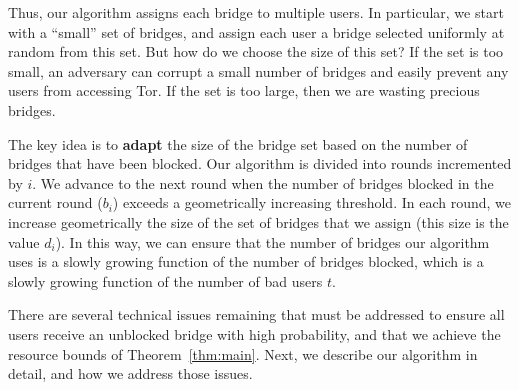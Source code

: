 \documentclass[letterpaper,twocolumn,10pt]{article}
\begin{document}
Thus, our algorithm assigns each bridge to multiple users.  In particular, we start with a ``small'' set of bridges, and assign each user a bridge selected uniformly at random from this set.  But how do we choose the size of this set?  If the set is too small, an adversary can corrupt a small number of bridges and easily prevent any users from accessing Tor.  If the set is too large, then we are wasting precious bridges.

The key idea is to \textbf{adapt} the size of the bridge set based on the number of bridges that have been blocked.  Our algorithm is divided into rounds incremented by $i$.  We advance to the next round when the number of bridges blocked in the current round ($b_i$) exceeds a geometrically increasing threshold.  In each round, we increase geometrically the size of the set of bridges that we assign (this size is the value $d_i$).  In this way, we can ensure that the number of bridges our algorithm uses is a slowly growing function of the number of bridges blocked, which is a slowly growing function of the number of bad users $t$.

There are several technical issues remaining that must be addressed to ensure all users receive an unblocked bridge with high probability, and that we achieve the resource bounds of Theorem~\ref{thm:main}.  Next, we describe our algorithm in detail, and how we address those issues. 




\end{document}
